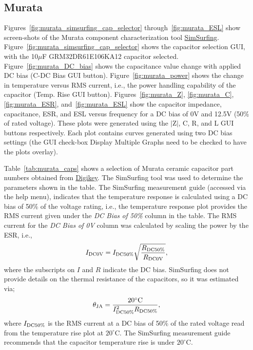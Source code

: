 \documentclass[10pt,twoside]{article}
\begin{document}
\clearpage
\subsection{Murata}

Figures~\ref{fig:murata_simsurfing_cap_selector} 
through~\ref{fig:murata_ESL} show screen-shots of the Murata 
component characterization tool
\href{http://www.murata.com/simsurfing/}{SimSurfing}. 
%
Figure~\ref{fig:murata_simsurfing_cap_selector} shows the capacitor
selection GUI, with the 10$\mu$F GRM32DR61E106KA12 capacitor selected.
Figure~\ref{fig:murata_DC_bias} shows the capacitance value change
with applied DC bias (C-DC Bias GUI button).
%
Figure~\ref{fig:murata_power} shows the change in temperature
versus RMS current, i.e., the power handling capability of the
capacitor (Temp. Rise GUI button).
%
Figures~\ref{fig:murata_Z}, \ref{fig:murata_C}, \ref{fig:murata_ESR}, 
and~\ref{fig:murata_ESL} show the capacitor impedance, capacitance,
ESR, and ESL versus frequency for a DC bias of 0V and 12.5V (50\% of 
rated voltage). These plots were generated using the $|$Z$|$, C, R, and L
GUI buttons respectively. Each plot contains curves generated 
using two DC bias settings (the GUI check-box Display Multiple Graphs
need to be checked to have the plots overlay).

Table~\ref{tab:murata_caps} shows a selection of Murata ceramic capacitor
part numbers obtained from \href{http://www.digikey.com}{Digikey}.
The SimSurfing tool was used to determine the parameters shown in
the table. The SimSurfing measurement guide (accessed via the help menu),
indicates that the temperature response is calculated using a DC
bias of 50\% of the voltage rating, i.e., the temperature response
plot provides the RMS current given under the {\em DC Bias of 50\%}
column in the table. The RMS current for the {\em DC Bias of 0V}
column was calculated by scaling the power by the ESR, i.e.,
%
\begin{equation}
I_{\rm DC0V} = I_{\rm DC50\%}\sqrt{\frac{R_{\rm DC50\%}}{R_{\rm DC0V}}},
\end{equation}
% 
where the subscripts on $I$ and $R$ indicate the DC bias. 
SimSurfing does not provide details on the thermal
resistance of the capacitors, so it was estimated via;
%
\begin{equation}
\theta_{\rm JA} = \frac{20^\circ\text{C}}{I_{\rm DC50\%}^2R_{\rm DC50\%}},
\end{equation}
%
where $I_{\rm DC50\%}$ is the RMS current at a DC bias of 50\% of
the rated voltage read from the temperature rise plot at $20^\circ\text{C}$.
The SimSurfing measurement guide recommends that the capacitor temperature
rise is under $20^\circ\text{C}$.
\end{document}
